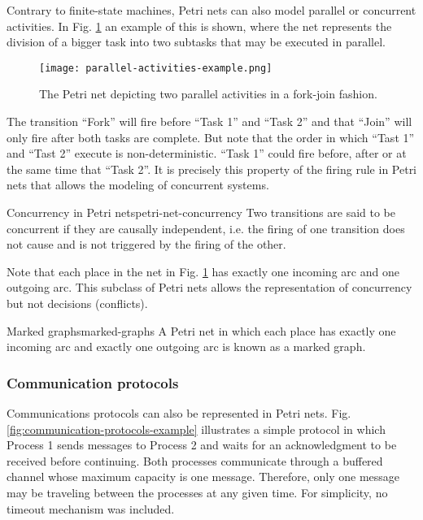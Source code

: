 Contrary to finite-state machines, Petri nets can also model parallel or concurrent activities.
In Fig. \ref{fig:parallel-activities-example} an example of this is shown,
where the net represents the division of a bigger task into two subtasks that may be executed in parallel.

\begin{figure}[H]
    \centering
    \texttt{[image: parallel-activities-example.png]}
    \caption{The Petri net depicting two parallel activities in a fork-join fashion.}
    \label{fig:parallel-activities-example}
\end{figure}

The transition ``Fork'' will fire before ``Task 1'' and ``Task 2''
and that ``Join'' will only fire after both tasks are complete.
But note that the order in which ``Tast 1'' and ``Tast 2'' execute is non-deterministic.
``Task 1'' could fire before, after or at the same time that ``Task 2''.
It is precisely this property of the firing rule in Petri nets that allows the modeling of concurrent systems.

\begin{definition}{Concurrency in Petri nets}{petri-net-concurrency}
    Two transitions are said to be concurrent if they are causally independent, i.e.
    the firing of one transition does not cause and is not triggered by the firing of the other.
\end{definition}

Note that each place in the net in Fig. \ref{fig:parallel-activities-example} has exactly one incoming arc
and one outgoing arc.
This subclass of Petri nets allows the representation of concurrency but not decisions (conflicts).

\begin{definition}{Marked graphs}{marked-graphs}
    A Petri net in which each place has exactly one incoming arc
    and exactly one outgoing arc is known as a marked graph.
\end{definition}

\subsubsection{Communication protocols}

Communications protocols can also be represented in Petri nets.
Fig. \ref{fig:communication-protocols-example} illustrates a simple protocol
in which Process 1 sends messages to Process 2 and waits for an acknowledgment to be received before continuing.
Both processes communicate through a buffered channel whose maximum capacity is one message.
Therefore, only one message may be traveling between the processes at any given time.
For simplicity, no timeout mechanism was included.


